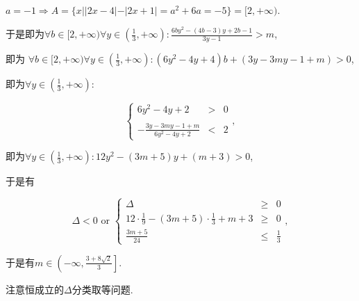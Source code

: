 \documentclass[8pt]{article}
\begin{document}
\begin{enumerate}[label=(\arabic*)]
\begin{enumerate}[label=(\arabic*)]
				$a=-1 \Rightarrow A=\{x||2x-4|-|2x+1|=a^2+6a=-5\}=[2, +\infty).$

				于是即为$\forall b\in[2, +\infty) \forall y\in\displaystyle\left(\frac{1}{3}, +\infty \right): \frac{6by^2-(4b-3)y+2b-1}{3y-1}>m$,

				即为 $\forall b\in[2, +\infty) \forall y\in\displaystyle\left(\frac{1}{3}, +\infty \right): (6y^2-4y+4)b+(3y-3my-1+m)>0$,

				即为$\forall y\in\displaystyle\left(\frac{1}{3}, +\infty \right): $

				$$
				\left\{
				\begin{array}{rcl}
				6y^2-4y+2&>&0\\\\
				-\displaystyle \frac{3y-3my-1+m}{6y^2-4y+2}&<&2
				\end{array}
				\right.,
				$$

				即为$\forall y\in\displaystyle\left(\frac{1}{3}, +\infty \right): 12y^2-(3m+5)y+(m+3)>0$,

				于是有

				$$
				\Delta < 0 \text{ or }
				\left\{
				\begin{array}{rcl}
				\Delta &\geq& 0\\
				12\cdot\displaystyle\frac{1}{9}-(3m+5)\cdot\frac{1}{3}+m+3 &\geq& 0\\
				\displaystyle \frac{3m+5}{24} &\leq& \displaystyle\frac{1}{3}
				\end{array}
				\right.,
				$$

				于是有$m\in\displaystyle \left(-\infty, \frac{3+8\sqrt{2}}{3}\right].$

				注意恒成立的$\Delta$分类取等问题.

		\end{enumerate}

	\end{enumerate}
\end{document}
